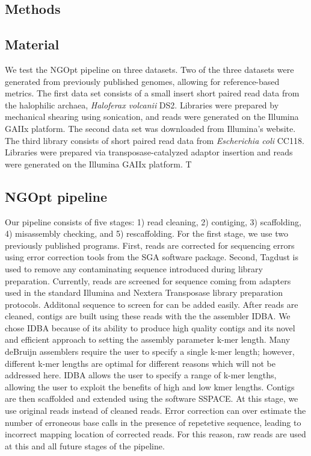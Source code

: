 \documentclass{bioinfo}
\begin{document}
\begin{methods}
\section{Methods}
\subsection{Material}

We test the NGOpt pipeline on three datasets. Two of the three datasets were generated from
previously published genomes, allowing for reference-based metrics. The first data set consists of a small insert 
short paired read data from the halophilic archaea, \emph{Haloferax volcanii} DS2. Libraries
were prepared by mechanical shearing using sonication, and reads were generated on
the Illumina GAIIx platform. The second data set was downloaded from Illumina's website. 
The third library consists of short paired read data from \emph{Escherichia 
coli} CC118. Libraries were prepared via transposase-catalyzed adaptor insertion and reads 
were generated on the Illumina GAIIx platform. T


\subsection{NGOpt pipeline}

Our pipeline consists of five stages: 1) read cleaning, 2) contiging, 3) scaffolding,
4) misassembly checking, and 5) rescaffolding. For the first stage, we use two previously
published programs. First, reads are corrected for sequencing errors using error correction tools 
from the SGA software package. Second, Tagdust is used to remove any contaminating sequence introduced
during library preparation. Currently, reads are screened for sequence coming from adapters
used in the standard Illumina and Nextera Transposase library preparation protocols. Additonal 
sequence to screen for can be added easily. After reads are cleaned, contigs are built
using these reads with the the assembler IDBA. We chose IDBA because of its ability to produce 
high quality contigs and its novel and efficient approach to setting the assembly parameter k-mer length. 
Many deBruijn assemblers require the user to specify a single k-mer length; however, different k-mer
lengths are optimal for different reasons which will not be addressed here. IDBA allows the user to specify
a range of k-mer lengths, allowing the user to exploit the benefits of high and low kmer lengths.
Contigs are then scaffolded and extended using the software SSPACE. At this stage, we use original reads
instead of cleaned reads. Error correction can over estimate the number of erroneous base calls in 
the presence of repetetive sequence, leading to incorrect mapping location of corrected reads. 
For this reason, raw reads are used at this and all future stages of the pipeline. 


\end{methods}
\end{document}
